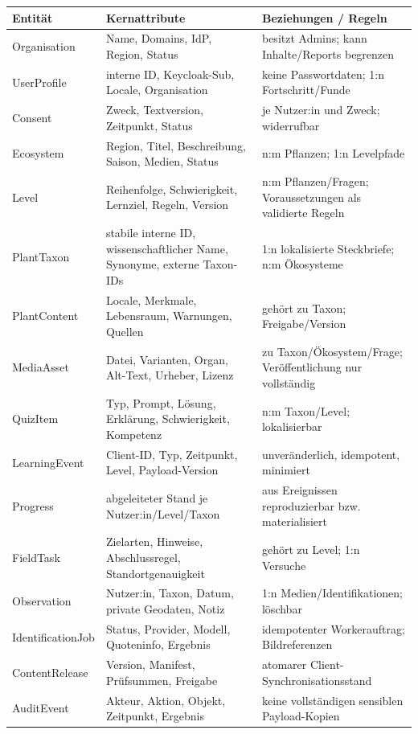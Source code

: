 \documentclass[10pt,a4paper,oneside]{article}
\begin{document}
\begin{longtable}{@{}p{30mm}p{62mm}p{66mm}@{}}
\toprule
\textbf{Entität} & \textbf{Kernattribute} & \textbf{Beziehungen / Regeln} \\
\midrule
\endhead
Organisation & Name, Domains, IdP, Region, Status & besitzt Admins; kann Inhalte/Reports begrenzen \\
UserProfile & interne ID, Keycloak-Sub, Locale, Organisation & keine Passwortdaten; 1:n Fortschritt/Funde \\
Consent & Zweck, Textversion, Zeitpunkt, Status & je Nutzer:in und Zweck; widerrufbar \\
Ecosystem & Region, Titel, Beschreibung, Saison, Medien, Status & n:m Pflanzen; 1:n Levelpfade \\
Level & Reihenfolge, Schwierigkeit, Lernziel, Regeln, Version & n:m Pflanzen/Fragen; Voraussetzungen als validierte Regeln \\
PlantTaxon & stabile interne ID, wissenschaftlicher Name, Synonyme, externe Taxon-IDs & 1:n lokalisierte Steckbriefe; n:m Ökosysteme \\
PlantContent & Locale, Merkmale, Lebensraum, Warnungen, Quellen & gehört zu Taxon; Freigabe/Version \\
MediaAsset & Datei, Varianten, Organ, Alt-Text, Urheber, Lizenz & zu Taxon/Ökosystem/Frage; Veröffentlichung nur vollständig \\
QuizItem & Typ, Prompt, Lösung, Erklärung, Schwierigkeit, Kompetenz & n:m Taxon/Level; lokalisierbar \\
LearningEvent & Client-ID, Typ, Zeitpunkt, Level, Payload-Version & unveränderlich, idempotent, minimiert \\
Progress & abgeleiteter Stand je Nutzer:in/Level/Taxon & aus Ereignissen reproduzierbar bzw. materialisiert \\
FieldTask & Zielarten, Hinweise, Abschlussregel, Standortgenauigkeit & gehört zu Level; 1:n Versuche \\
Observation & Nutzer:in, Taxon, Datum, private Geodaten, Notiz & 1:n Medien/Identifikationen; löschbar \\
IdentificationJob & Status, Provider, Modell, Quoteninfo, Ergebnis & idempotenter Workerauftrag; Bildreferenzen \\
ContentRelease & Version, Manifest, Prüfsummen, Freigabe & atomarer Client-Synchronisationsstand \\
AuditEvent & Akteur, Aktion, Objekt, Zeitpunkt, Ergebnis & keine vollständigen sensiblen Payload-Kopien \\
\bottomrule
\end{longtable}
\end{document}
